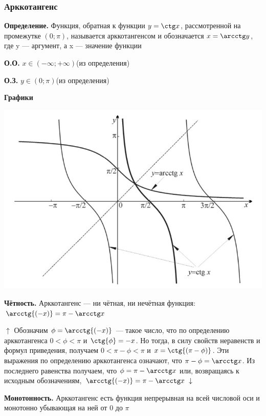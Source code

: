 \documentclass{article}
\begin{document}
        \subsubsection{Арккотангенс}
        
        \textbf{Определение.} Функция, обратная к функции \(y = \ctg x\), рассмотренной на промежутке \((0; \pi)\), называется арккотангенсом и обозначается \(x = \arcctg y\), где y --- аргумент, а x --- значение функции
        
        \textbf{О.О.} \(x \in (-\infty; +\infty)\)(из определения)
        
        \textbf{О.З.} \(y \in (0; \pi)\)(из определения)
        
        \textbf{Графики}
        \begin{center}
            \includegraphics[scale=0.4]{7}
        \end{center}
        
        \textbf{Чётность.} Арккотангенс --- ни чётная, ни нечётная функция: \(\arcctg{(-x)} = \pi - \arcctg x\)
        
        \(\uparrow\) Обозначим \(\phi = \arcctg{(-x)}\) --- такое число, что по определению арккотангенса \(0 < \phi < \pi\) и \(\ctg{\phi} = -x\). Но тогда, в силу свойств неравенств и формул приведения, получаем
        \(0 < \pi-\phi < \pi\) и \(x = \ctg{(\pi - \phi)}\). Эти выражения по определению арккотангенса означают, что \(\pi-\phi = \arcctg x\).
        Из последнего равенства получаем, что \(\phi = \pi-\arcctg x\) или, возвращаясь к исходным обозначениям, \(\arcctg{(-x)} = \pi - \arcctg x \ \downarrow\)
        
        \textbf{Монотонность.} Арккотангенс есть функция непрерывная на всей числовой оси и монотонно убывающая на ней от \(0\) до \(\pi\)
    
\end{document}
